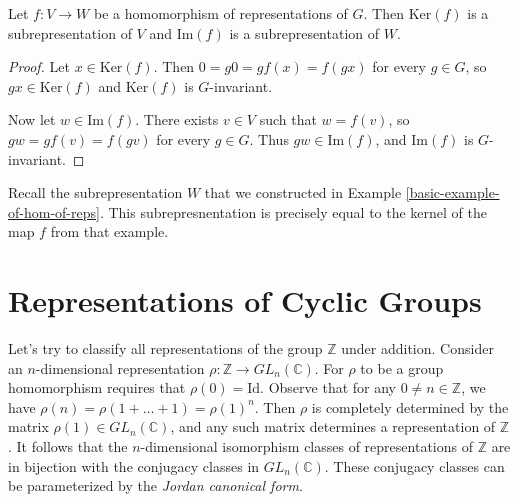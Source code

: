 \begin{prop}\label{ker-im-subreprns}
Let $f \colon V \to W$ be a homomorphism of representations of $G$.  Then $\text{Ker}(f)$ is a subrepresentation of $V$ and $\text{Im}(f)$ is a subrepresentation of $W$.
\end{prop}
\begin{proof}
Let $x \in \text{Ker}(f)$. Then $0 = g0 = g f(x) = f(gx)$ for every $g \in G$,
so $gx \in \text{Ker}(f)$ and $\text{Ker}(f)$ is $G$-invariant.

Now let $w \in \text{Im}(f)$. There exists $v \in V$ such that $w = f(v)$, so $g w = g f(v) = f
(gv)$ for
every $g \in G$. Thus $gw \in \text{Im}(f)$, and $\text{Im}(f)$ is $G$-invariant.
\end{proof}
\begin{note}
Recall the subrepresentation $W$ that we constructed in Example \ref{basic-example-of-hom-of-reps}.  This
subrepresnentation
 is
precisely equal
 to the
kernel of the map $f$ from that example.
\end{note}


%
\section{Representations of Cyclic Groups}
\begin{example}
Let's try to classify all representations of the group $\mathbb{Z}$ under addition.  Consider an $n$-dimensional representation $\rho \colon \mathbb{Z} \to GL_n (\mathbb{C})$.  For $\rho$ to be a group homomorphism requires that $\rho(0) = \text{Id}$.  Observe that for any $0 \neq n \in \mathbb{Z}$, we have $\rho(n) = \rho( 1 + \ldots + 1) = \rho(1)^n$.  Then $\rho$ is completely determined by the matrix $\rho(1) \in GL_n(\mathbb{C})$, and any such matrix determines a representation of $\mathbb{Z}$.  It follows that the $n$-dimensional isomorphism classes of representations of $\mathbb{Z}$ are in bijection with the conjugacy classes in $GL_n(\mathbb{C})$.  These conjugacy classes can be parameterized by the \textit{Jordan canonical form}.
\end{example}

